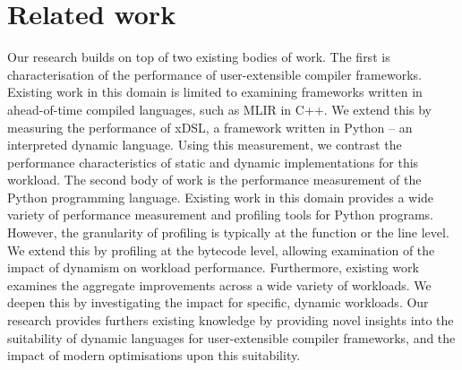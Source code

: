 \chapter{Related work}
\label{chap:related-work}

%
%

Our research builds on top of two existing bodies of work.
The first is characterisation of the performance of user-extensible compiler frameworks. Existing work in this domain is limited to examining frameworks written in ahead-of-time compiled languages, such as MLIR in C++. We extend this by measuring the performance of xDSL, a framework written in Python -- an interpreted dynamic language. Using this measurement, we contrast the performance characteristics of static and dynamic implementations for this workload.
The second body of work is the performance measurement of the Python programming language. Existing work in this domain provides a wide variety of performance measurement and profiling tools for Python programs. However, the granularity of profiling is typically at the function or the line level. We extend this by profiling at the bytecode level, allowing examination of the impact of dynamism on workload performance. Furthermore, existing work examines the aggregate improvements across a wide variety of workloads. We deepen this by investigating the impact for specific, dynamic workloads.
Our research provides furthers existing knowledge by providing novel insights into the suitability of dynamic languages for user-extensible compiler frameworks, and the impact of modern optimisations upon this suitability.





